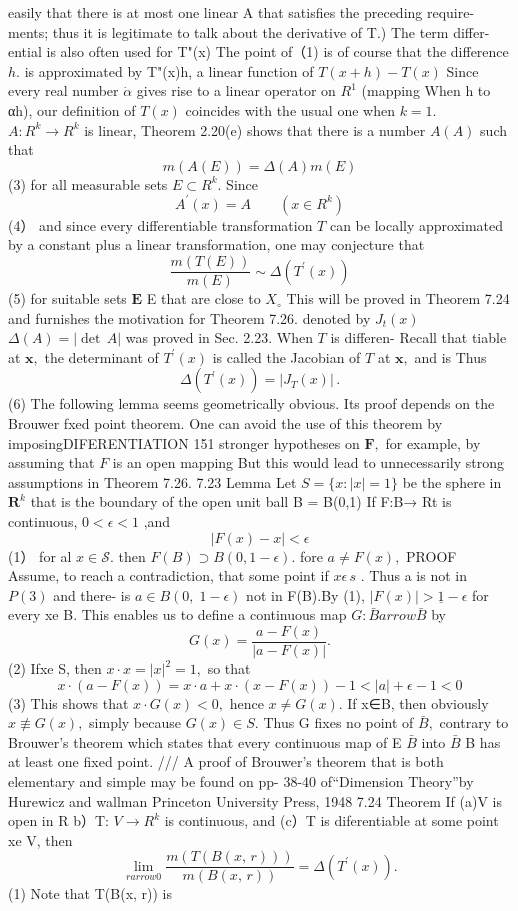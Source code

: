easily that there is at most one linear A that satisfies the preceding require- ments; thus it is legitimate to talk about the derivative of T.) The term differ- ential is also often used for T"(x) The point of（1) is of course that the difference $h.$ is approximated by T"(x)h, a linear function of $T(x+h)-T(x)$ Since every real number $\scriptstyle{\dot{\alpha}}$ gives rise to a linear operator on $R^{1}$ (mapping When h to αh), our definition of $\scriptstyle T(x)$ coincides with the usual one when $k=1.$ $A\colon R^{k}\to R^{k}$ is linear, Theorem 2.20(e) shows that there is a number $\scriptstyle A(A)$ such that $$ m(A(E))=\Delta(A)m(E) $$ (3) for all measurable sets $E\subset R^{k}.$ Since $$ A^{\prime}(x)=A\qquad(x\in R^{k}) $$ (4） and since every differentiable transformation ${\mathbf{}}T$ can be locally approximated by a constant plus a linear transformation, one may conjecture that $$ {\frac{m(T(E))}{m(E)}}\sim\Delta(T^{\prime}(x)) $$ (5) for suitable sets $\boldsymbol{E}$ E that are close to $\scriptstyle{X_{\circ}}$ This will be proved in Theorem 7.24 and furnishes the motivation for Theorem 7.26. denoted by $\scriptstyle J_{t}(x)$ $\Delta(A)=|\operatorname*{det}\,A|$ was proved in Sec. 2.23. When ${\mathbf{}}T$ is differen- Recall that tiable at ${\boldsymbol{x}},$ the determinant of $T^{\prime}(x)$ is called the Jacobian of ${\mathbf{}}T$ at ${\boldsymbol{x}},$ and is Thus $$ \Delta(T^{\prime}(x))=|J_{T}(x)|\,. $$ (6) The following lemma seems geometrically obvious. Its proof depends on the Brouwer fxed point theorem. One can avoid the use of this theorem by imposingDIFERENTIATION 151 stronger hypotheses on ${\boldsymbol{F}},$ for example, by assuming that ${\mathbf{}}F$ is an open mapping But this would lead to unnecessarily strong assumptions in Theorem 7.26. 7.23 Lemma Let $S=\{x:|x|=1\}$ be the sphere in ${\boldsymbol{R}}^{k}$ that is the boundary of the open unit ball B = B(0,1) If F:B→ Rt is continuous, $0<\epsilon<1$ ,and $$ |F(x)-x|<\epsilon $$ (1） for al $x\in{\mathcal{S}}.$ then $F(B)\supset B(0,1-\epsilon).$ fore $a\neq F(x),$ PROOF Assume, to reach a contradiction, that some point if $x\epsilon\,s$ . Thus a is not in $\scriptstyle{P(3)}$ and there- is $a\in B(0,\;1-\epsilon)$ not in F(B).By (1), $|F(x)|>{\underline{{1}}}-\epsilon$ for every xe B. This enables us to define a continuous map $G\colon{\bar{B}} arrow{\bar{B}}$ by $$ G(x)={\frac{a-F(x)}{|a-F(x)|}}. $$ (2) Ifxe S, then $x\cdot x=|x|^{2}=1,$ so that $$ x\cdot(a-F(x))=x\cdot a+x\cdot(x-F(x))-1<|a|+\epsilon-1<0 $$ (3) This shows that $x\cdot G(x)<0,$ hence $x\neq G(x).$ If x∈B, then obviously $x\not\equiv G(x),$ simply because $G(x)\in S.$ Thus G fixes no point of ${\bar{B}},$ contrary to Brouwer's theorem which states that every continuous map of E $\bar{B}$ into $\bar{B}$ B has at least one fixed point. /// A proof of Brouwer's theorem that is both elementary and simple may be found on pp- 38-40 of“Dimension Theory”by Hurewicz and wallman Princeton University Press, 1948 7.24 Theorem If (a)V is open in R b）T: $V{\boldsymbol{\to}}R^{k}$ is continuous, and (c）T is diferentiable at some point xe V, then $$ \operatorname*{lim}_{r arrow0}\frac{m(T(B(x,\,r)))}{m(B(x,\,r))}=\Delta(T^{\prime}(x)). $$ (1) Note that T(B(x, r)) is 